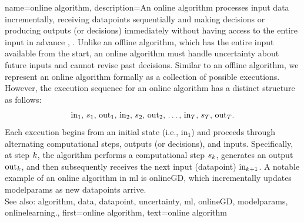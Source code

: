 {name={online algorithm},
	description={An online \gls{algorithm} processes input \gls{data} incrementally, 
		receiving \glspl{datapoint} sequentially and making decisions or producing outputs (or decisions) immediately 
		without having access to the entire input in advance \cite{PredictionLearningGames}, \cite{HazanOCO}. 
		Unlike an offline \gls{algorithm}, which has the entire input available from the start, an online \gls{algorithm} 
		must handle \gls{uncertainty} about future inputs and cannot revise past decisions. Similar to an 
		offline \gls{algorithm}, we represent an online \gls{algorithm} formally as a collection of possible 
		executions. However, the execution sequence for an online \gls{algorithm} has a distinct structure as follows:
		$${\rm in}_{1}, \,s_1, \,{\rm out}_{1}, \,{\rm in}_{2}, \,s_2, \,{\rm out}_{2}, \,\ldots, \,{\rm in}_{T}, \,s_T, \,{\rm out}_{T}.$$ 
		Each execution begins from an initial state (i.e., \(\text{in}_{1}\)) and proceeds through alternating 
		computational steps, outputs (or decisions), and inputs. Specifically, at step \(k\), 
		the \gls{algorithm} performs a computational step \(s_{k}\), generates an output \(\text{out}_{k}\), 
		and then subsequently receives the next input (\gls{datapoint}) \(\text{in}_{k+1}\). A 
		notable example of an online \gls{algorithm} in \gls{ml} is \gls{onlineGD}, which incrementally 
		updates \glspl{modelparam} as new \glspl{datapoint} arrive. 
					\\ 
		See also: \gls{algorithm}, \gls{data}, \gls{datapoint}, \gls{uncertainty}, \gls{ml}, \gls{onlineGD}, \glspl{modelparam}, \gls{onlinelearning}.},
	first={online algorithm},
	text={online algorithm} 
}


